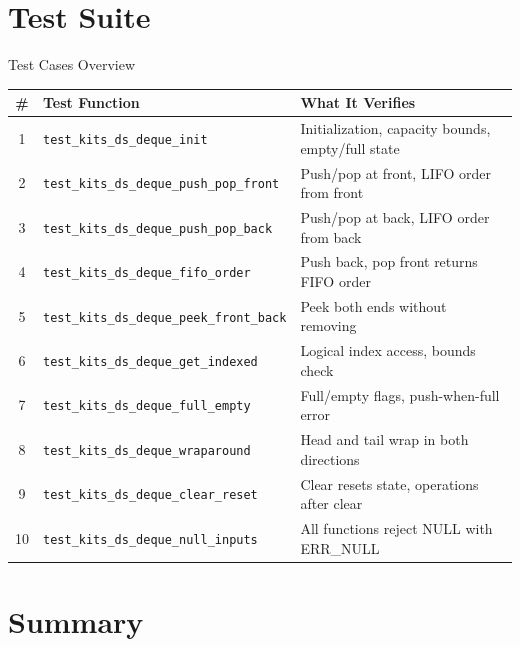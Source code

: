 \documentclass[aspectratio=169, 10pt]{beamer}
\begin{document}
\section{Test Suite}

\begin{frame}{Test Cases Overview}
\begin{table}
\centering
\small
\begin{tabular}{@{}clp{7cm}@{}}
\toprule
\textbf{\#} & \textbf{Test Function} & \textbf{What It Verifies} \\
\midrule
1 & \texttt{test\_kits\_ds\_deque\_init}
  & Initialization, capacity bounds, empty/full state \\
2 & \texttt{test\_kits\_ds\_deque\_push\_pop\_front}
  & Push/pop at front, LIFO order from front \\
3 & \texttt{test\_kits\_ds\_deque\_push\_pop\_back}
  & Push/pop at back, LIFO order from back \\
4 & \texttt{test\_kits\_ds\_deque\_fifo\_order}
  & Push back, pop front returns FIFO order \\
5 & \texttt{test\_kits\_ds\_deque\_peek\_front\_back}
  & Peek both ends without removing \\
6 & \texttt{test\_kits\_ds\_deque\_get\_indexed}
  & Logical index access, bounds check \\
7 & \texttt{test\_kits\_ds\_deque\_full\_empty}
  & Full/empty flags, push-when-full error \\
8 & \texttt{test\_kits\_ds\_deque\_wraparound}
  & Head and tail wrap in both directions \\
9 & \texttt{test\_kits\_ds\_deque\_clear\_reset}
  & Clear resets state, operations after clear \\
10 & \texttt{test\_kits\_ds\_deque\_null\_inputs}
   & All functions reject NULL with ERR\_NULL \\
\bottomrule
\end{tabular}
\end{table}
\end{frame}

\section{Summary}
\end{document}
